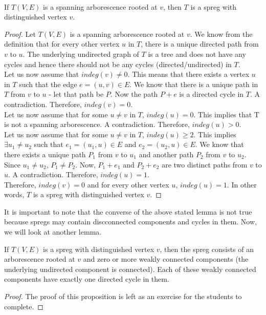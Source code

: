 \noindent\\
\begin{lemma} If $T(V,E)$ is a spanning arborescence rooted at $v$, then $T$ is a spreg with distinguished vertex $v$.
\end{lemma}
\begin{proof}
Let $T(V,E)$ is a spanning arborescence rooted at $v$. We know from the definition that for every other vertex $u$ in $T$, there is a unique directed path from $v$ to $u$. The underlying undirected graph of $T$ is a tree and does not have any cycles and hence there should not be any cycles (directed/undirected) in $T$.\\
Let us now assume that $indeg(v) \neq 0$. This means that there exists a vertex $u$ in $T$ such that the edge $e = (u,v)\in E$. We know that there is a unique path in $T$ from $v$ to $u$ - let that path be $P$. Now the path $P+e$ is a directed cycle in $T$. A contradiction. Therefore, $indeg(v) = 0$.\\
Let us now assume that for some $u \neq v$ in $T$, $indeg(u) = 0$. This implies that T is not a spanning arborescence.  A contradiction. Therefore, $indeg(u) > 0$. \\
Let us now assume that for some $u \neq v$ in $T$, $indeg(u) \geq 2$. This implies $\exists u_1 \neq u_2$ such that $e_1 = (u_1,u) \in E$ and $e_2 = (u_2,u) \in E$. We know that there exists a unique path $P_1$ from $v$ to $u_1$ and another path $P_2$ from $v$ to $u_2$. Since $u_1 \neq u_2$, $P_1 \neq P_2$. Now, $P_1+e_1$ and $P_2+e_2$ are two distinct paths from $v$ to $u$. A contradiction. Therefore, $indeg(u) = 1$.\\
Therefore,  $indeg(v) = 0$ and for every other vertex $u$, $indeg(u) = 1$. In other words, $T$ is a spreg with distinguished vertex $v$.
\end{proof}
\noindent It is important to note that the converse of the above stated lemma is not true because spregs may contain discconnected components and cycles in them. Now, we will look at another lemma.
\noindent\\
\begin{lemma} If $T(V,E)$ is a spreg with distinguished vertex $v$, then the spreg consists of an arborescence rooted at $v$ and zero or more weakly connected components (the underlying undirected component is connected). Each of these weakly connected components have exactly one directed cycle in them.
\end{lemma}
\begin{proof}
The proof of this proposition is left as an exercise for the students to complete.
\end{proof}
